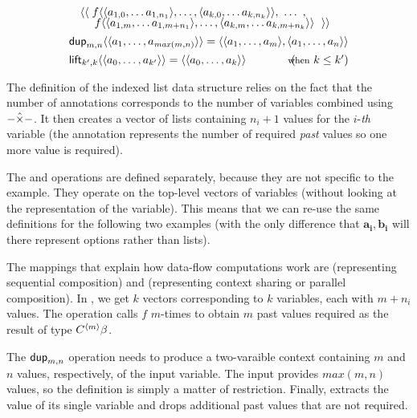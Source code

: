 \begin{example}
\begin{equation*}
\begin{array}{l}
\quad \langle\langle\; f \langle \langle a_{1,0}, \ldots a_{1,{n_1}} \rangle, \ldots, \langle a_{k,0}, \ldots a_{k,{n_k}} \rangle \rangle, ~\ldots~, \\[-0.25em]
\quad ~~~\; f \langle \langle a_{1,m}, \ldots a_{1,m+{n_1}} \rangle, \ldots, \langle a_{k,m}, \ldots a_{k,m+{n_k}} \rangle \rangle~\; \rangle\rangle
\\[0.45em]
\textnormal{\sffamily dup}_{m, n} \langle \langle a_1, \ldots, a_{\mathit{max}(m,n)} \rangle \rangle =
   \langle \langle a_1, \ldots, a_m \rangle, \langle a_1, \ldots, a_n \rangle \rangle
\\[0.45em]
\textnormal{\sffamily lift}_{k', k} \langle\langle a_0, \ldots, a_{k'} \rangle\rangle = 
  \langle\langle a_0, \ldots, a_k \rangle\rangle \qquad\qquad(\hspace{-0.95em}\textnormal{\footnotesize when}~k\leq k')
\end{array}
\end{equation*}
\end{example}

\noindent
The definition of the indexed list data structure relies on the fact that the number of annotations
corresponds to the number of variables combined using $-\hat{\times}-$. It then creates a vector of lists
containing $n_i+1$ values for the $i$-\textit{th} variable (the annotation represents the number of 
required \emph{past} values so one more value is required).

The  and  operations are defined separately, because they are not specific
to the example. They operate on the top-level vectors of variables (without looking at the 
representation of the variable). This means that we can re-use the same definitions for the following
two examples (with the only difference that $\mathbf{a_i}, \mathbf{b_i}$ will there represent options
rather than lists).

The mappings that explain how data-flow computations work are  (representing sequential
composition) and  (representing context sharing or parallel composition). In ,
we get $k$ vectors corresponding to $k$ variables, each with $m+n_i$ values. The operation calls 
$f$ $m$-times to obtain $m$ past values required as the result of type $C^{\langle m \rangle}\beta$.

The $\textnormal{\sffamily dup}_{m,n}$ operation needs to produce a two-varaible context containing $m$ and $n$ values,
respectively, of the input variable. The input provides $\mathit{max}(m, n)$ values, so the definition
is simply a matter of restriction. Finally,  extracts the value of its single variable
and  drops additional past values that are not required.

